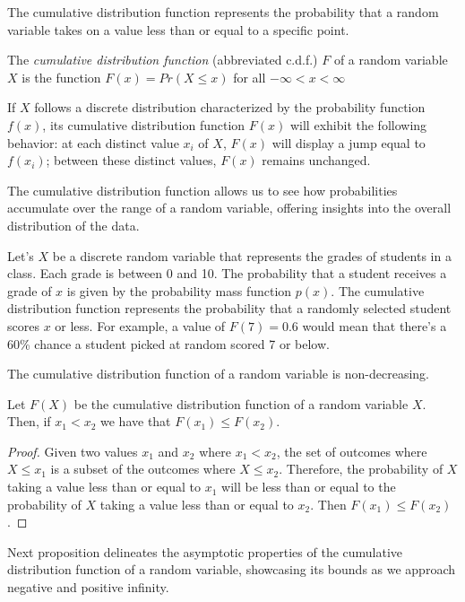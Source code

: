 The cumulative distribution function represents the probability that a random variable takes on a value less than or equal to a specific point.

\begin{definition}
The \emph{cumulative distribution function} (abbreviated c.d.f.) $F$ of a random variable $X$ is the function $F(x)=Pr(X\leq x)$ for all $-\infty < x < \infty$
\end{definition}

If $X$ follows a discrete distribution characterized by the probability function $f(x)$, its cumulative distribution function $F(x)$ will exhibit the following behavior: at each distinct value $x_i$ of $X$, $F(x)$ will display a jump equal to $f(x_i)$; between these distinct values, $F(x)$ remains unchanged.

The cumulative distribution function allows us to see how probabilities accumulate over the range of a random variable, offering insights into the overall distribution of the data.

\begin{example}
Let's $X$ be a discrete random variable that represents the grades of students in a class. Each grade is between 0 and 10. The probability that a student receives a grade of $x$ is given by the probability mass function $p(x)$. The cumulative distribution function represents the probability that a randomly selected student scores $x$ or less. For example, a value of $F(7) =
0.6$ would mean that there's a 60\% chance a student picked at random scored 7 or below.
\end{example}

The cumulative distribution function of a random variable is non-decreasing. 

\begin{proposition}
Let $F(X)$ be the cumulative distribution function of a random variable $X$. Then, if $x_{1}<x_{2}$ we have that $F\left(x_{1}\right)\leq F\left(x_{2}\right)$.
\end{proposition}
\begin{proof}
Given two values $x_1$ and $x_2$ where $x_1 < x_2$, the set of outcomes where $X \leq x_1$ is a subset of the outcomes where $X \leq x_2$.  Therefore, the probability of $X$ taking a value less than or equal to $x_1$ will be less than or equal to the probability of $X$ taking a value less than or equal to $x_2$. Then $F(x_1) \leq F(x_2)$.
\end{proof}

Next proposition delineates the asymptotic properties of the cumulative distribution function of a random variable, showcasing its bounds as we approach negative and positive infinity.

